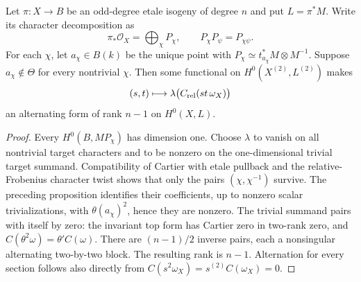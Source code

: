\begin{corollary}
\label{cor:principal-theta-odd-cover-dual-rank}
Let \(\pi:X\to B\) be an odd-degree etale isogeny of degree \(n\)
and put \(L=\pi^*M\).  Write its character decomposition as
\[
 \pi_*\mathcal O_X=\bigoplus_\chi P_\chi,
 \qquad P_\chi P_\psi=P_{\chi\psi}.
\]
For each \(\chi\), let \(a_\chi\in B(k)\) be the unique point
with \(P_\chi\simeq t_{a_\chi}^*M\otimes M^{-1}\).
Suppose \(a_\chi\notin\Theta\) for every nontrivial \(\chi\).
Then some functional on \(H^0(X^{(2)},L^{(2)})\) makes
\[
 (s,t)\longmapsto\lambda\bigl(C_{\rm rel}(st\,\omega_X)\bigr)
\]
an alternating form of rank \(n-1\) on \(H^0(X,L)\).
\end{corollary}
\begin{proof}
Every \(H^0(B,MP_\chi)\) has dimension one.  Choose \(\lambda\)
to vanish on all nontrivial target characters and to be nonzero on the
one-dimensional trivial target summand.  Compatibility of Cartier with
etale pullback and the relative-Frobenius character twist shows that
only the pairs \((\chi,\chi^{-1})\) survive.  The preceding
proposition identifies their coefficients, up to nonzero scalar
trivializations, with \(\theta(a_\chi)^2\), hence they are nonzero.
The trivial summand pairs with itself by zero: the invariant top form
has Cartier zero in two-rank zero, and
\(C(\theta^2\omega)=\theta' C(\omega)\).
There are \((n-1)/2\) inverse pairs, each a nonsingular alternating
two-by-two block.  The resulting rank is \(n-1\).  Alternation for
every section follows also directly from
\(C(s^2\omega_X)=s^{(2)}C(\omega_X)=0\).
\end{proof}

